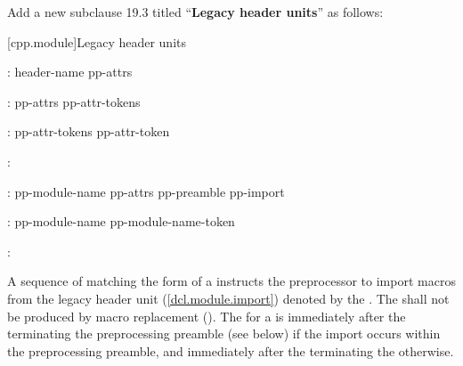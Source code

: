 \begin{after}
\noindent
Add a new subclause 19.3 titled ``\textbf{Legacy header units}'' as follows:

\setcounter{section}{2}
[cpp.module]{Legacy header units}%
\resetalinea[0]

\begin{std.txt}
\color{addclr}
\begin{bnf}
:\br
  \opt{} \opt{} header-name pp-attrs\opt{} \terminal{;}
\end{bnf}

\begin{bnf}
:\br
  pp-attrs\opt{} \terminal{[} \terminal{[} pp-attr-tokens \terminal{]} \terminal{]}
\end{bnf}

\begin{bnf}
:\br
  pp-attr-tokens\opt{} pp-attr-token
\end{bnf}

\begin{bnf}
:\br
\end{bnf}

\begin{bnf}
:\br
  \opt{} pp-module-name pp-attrs\opt{} \terminal{;}
  pp-preamble pp-import
\end{bnf}

\begin{bnf}
:\br
  pp-module-name\opt{} pp-module-name-token
\end{bnf}

\begin{bnf}
:\br
  \descr{any \grammarterm{preprocessing-token} other than \terminal{[} or \terminal{;}}
\end{bnf}

\color{addclr}
\alinea
A sequence of  matching the form
of a 
instructs the preprocessor to import macros from the legacy header unit
(\ref{dcl.module.import}) denoted by the .
The \tcode{;}  shall not be produced by
macro replacement ().
The  for a  is
immediately after the \tcode{;} terminating the preprocessing preamble
(see below) if the import occurs within the preprocessing preamble, and
immediately after the \tcode{;} terminating the 
otherwise.


\end{std.txt}
\end{after}
